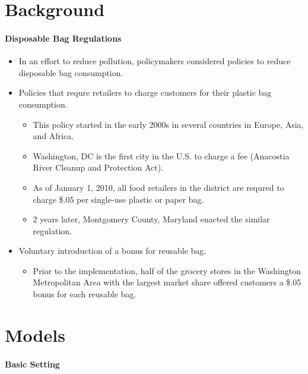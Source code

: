 \documentclass[../root]{subfiles}
\begin{document}
    \section{Background}

    \paragraph{Disposable Bag Regulations}

    \begin{itemize}
      \item In an effort to reduce pollution, policymakers considered policies to reduce disposable bag consumption.
      \item Policies that requre retailers to charge customers for their plastic bag consumption.
      \begin{itemize}
        \item This policy started in the early 2000s in several countries in Europe, Asia, and Africa.
        \item Washington, DC is the first city in the U.S. to charge a fee (Anacostia River Cleanup and Protection Act).
        \item As of January 1, 2010, all food retailers in the district are requred to charge \$.05 per single-use plastic or paper bag.
        \item 2 years later, Montgomery County, Maryland enacted the similar regulation.
      \end{itemize}
      \item Voluntary introduction of a bonus for reusable bag.
      \begin{itemize}
        \item Prior to the implementation, half of the grocery stores in the Washington Metropolitan Area with the largest market share offered customers a \$.05 bonus for each reusable bag.
      \end{itemize}
    \end{itemize}


    \section{Models}

    \paragraph{Basic Setting}
\end{document}
